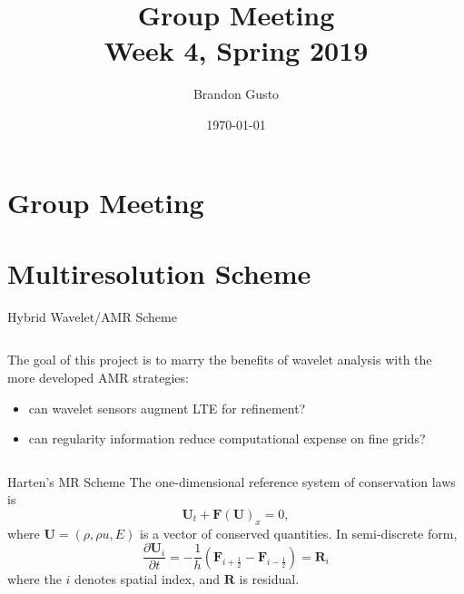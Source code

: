 \documentclass{beamer}
\begin{document}
\section{Group Meeting}
\title{Group Meeting \\ Week 4, Spring 2019}
\author{Brandon Gusto} %
\date{\today}
\frame{\titlepage}

\section{Multiresolution Scheme}

\begin{frame}{Hybrid Wavelet/AMR Scheme}
    \begin{columns}
        \begin{column}{0.58\textwidth}
            The goal of this project is to marry the benefits of wavelet analysis with the more developed AMR strategies:
            \begin{itemize}
                \item can wavelet sensors augment LTE for refinement?
                \item can regularity information reduce computational expense on fine grids?
            \end{itemize}
        \end{column}
        \begin{column}{0.44\textwidth}
            \scalebox{0.4}{
                
            }
        \end{column}
    \end{columns}
\end{frame}

\begin{frame}{Harten's MR Scheme}
    The one-dimensional reference system of conservation laws is
    \begin{equation*}
        \mathbf{U}_{t} + \mathbf{F}(\mathbf{U})_{x} = 0,
    \end{equation*}
    where $\mathbf{U} = (\rho,\rho u,E)$ is a vector of conserved quantities.
    In semi-discrete form,
    \begin{equation*}
        \frac{\partial \mathbf{U}_{i}}{\partial t} = -\frac{1}{h} \left( \mathbf{F}_{i+\frac{1}{2}}
            - \mathbf{F}_{i-\frac{1}{2}} \right) = \mathbf{R}_{i}
    \end{equation*}
    where the $i$ denotes spatial index, and $\mathbf{R}$ is residual.
\end{frame}
\end{document}
